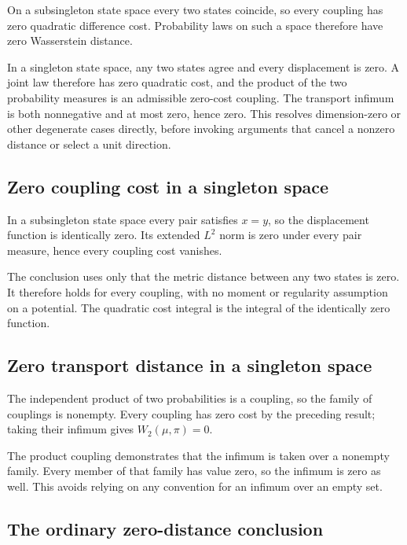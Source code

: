 \documentclass[11pt,a4paper]{article}
\begin{document}
On a subsingleton state space every two states coincide, so every coupling has zero quadratic difference cost. Probability laws on such a space therefore have zero Wasserstein distance.



In a singleton state space, any two states agree and every displacement is zero. A joint law therefore has zero quadratic cost, and the product of the two probability measures is an admissible zero-cost coupling. The transport infimum is both nonnegative and at most zero, hence zero. This resolves dimension-zero or other degenerate cases directly, before invoking arguments that cancel a nonzero distance or select a unit direction.


\subsection{\texorpdfstring{Zero coupling cost in a singleton space}{Zero coupling cost in a singleton space}}


In a subsingleton state space every pair satisfies \(x=y\), so the displacement function is identically zero. Its extended \(L^2\) norm is zero under every pair measure, hence every coupling cost vanishes.



The conclusion uses only that the metric distance between any two states is zero. It therefore holds for every coupling, with no moment or regularity assumption on a potential. The quadratic cost integral is the integral of the identically zero function.


\subsection{\texorpdfstring{Zero transport distance in a singleton space}{Zero transport distance in a singleton space}}


The independent product of two probabilities is a coupling, so the family of couplings is nonempty. Every coupling has zero cost by the preceding result; taking their infimum gives \(W_2(\mu,\pi)=0\).



The product coupling demonstrates that the infimum is taken over a nonempty family. Every member of that family has value zero, so the infimum is zero as well. This avoids relying on any convention for an infimum over an empty set.


\subsection{\texorpdfstring{The ordinary zero-distance conclusion}{The ordinary zero-distance conclusion}}
\end{document}
